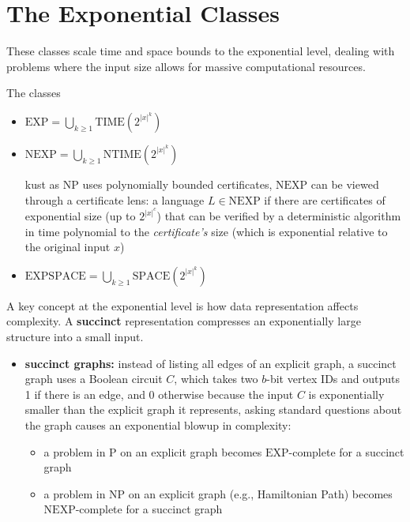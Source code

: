 \documentclass[a4paper, 11pt]{report}
\begin{document}
\section{The Exponential Classes}
These classes scale time and space bounds to the exponential level, dealing with problems where the input size allows for massive computational resources.

\begin{defframe}{The classes}{}
    \begin{itemize}
        \item $\text{EXP} = \bigcup_{k \ge 1} \text{TIME}(2^{|x|^k})$
        \item $\text{NEXP} = \bigcup_{k \ge 1} \text{NTIME}(2^{|x|^k})$
            
    \subitem kust as $\text{NP}$ uses polynomially bounded certificates, $\text{NEXP}$ can be viewed through a certificate lens: a language $L \in \text{NEXP}$ if there are certificates of exponential size (up to $2^{|x|^c}$) that can be verified by a deterministic algorithm in time polynomial to the \textit{certificate's} size (which is exponential relative to the original input $x$)
        \item $\text{EXPSPACE} = \bigcup_{k \ge 1} \text{SPACE}(2^{|x|^k})$
    \end{itemize}
\end{defframe}

A key concept at the exponential level is how data representation affects complexity. A \textbf{succinct} representation compresses an exponentially large structure into a small input. 
\begin{itemize}
    \item \textbf{succinct graphs:} instead of listing all edges of an explicit graph, a succinct graph uses a Boolean circuit $C$, which takes two $b$-bit vertex IDs and outputs 1 if there is an edge, and 0 otherwise
    \subitem because the input $C$ is exponentially smaller than the explicit graph it represents, asking standard questions about the graph causes an exponential blowup in complexity:
    \begin{itemize}
        \item a problem in $\text{P}$ on an explicit graph becomes $\text{EXP}$-complete for a succinct graph
        \item a problem in $\text{NP}$ on an explicit graph (e.g., Hamiltonian Path) becomes $\text{NEXP}$-complete for a succinct graph
    \end{itemize}
\end{itemize}
\end{document}
